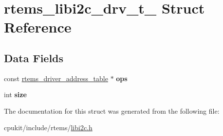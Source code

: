 \hypertarget{structrtems__libi2c__drv__t__}{}\section{rtems\+\_\+libi2c\+\_\+drv\+\_\+t\+\_\+ Struct Reference}
\label{structrtems__libi2c__drv__t__}
\subsection*{Data Fields}
\begin{DoxyCompactItemize}
\item 
\mbox{\label{structrtems__libi2c__drv__t___add28446c0df6cbc824806108b80ec17b}} 
const \mbox{\hyperlink{structrtems__driver__address__table}{rtems\+\_\+driver\+\_\+address\+\_\+table}} $\ast$ {\bfseries ops}
\item 
\mbox{\label{structrtems__libi2c__drv__t___ac025dedaded930c756da66bc62319a4b}} 
int {\bfseries size}
\end{DoxyCompactItemize}


The documentation for this struct was generated from the following file\+:\begin{DoxyCompactItemize}
\item 
cpukit/include/rtems/\mbox{\hyperlink{libi2c_8h}{libi2c.\+h}}\end{DoxyCompactItemize}
